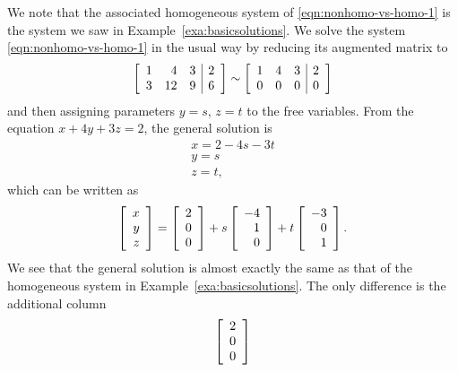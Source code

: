 \begin{solution}
  We note that the associated homogeneous system of
  {\eqref{eqn:nonhomo-vs-homo-1}} is the system we saw in
  Example~\ref{exa:basicsolutions}. We solve the system
  {\eqref{eqn:nonhomo-vs-homo-1}} in the usual way by reducing its
  augmented matrix to {\rref}
  \begin{equation*}
    \left[
    \begin{array}{rrr|r}
      1 & 4 & 3 & 2 \\
      3 & 12 & 9 & 6
    \end{array}
    \right]
    \sim
    \left[
    \begin{array}{rrr|r}
      1 & 4 & 3 & 2 \\
      0 & 0 & 0 & 0
    \end{array}
    \right]
  \end{equation*}
  and then assigning parameters $y=s$, $z=t$ to the free
  variables. From the equation $x+4y+3z=2$, the general solution is
  \begin{equation*}
    \begin{array}{c}
      x = 2 -4s - 3t \\
      y = s \\
      z = t,
    \end{array}
  \end{equation*}
  which can be written as 
  \begin{equation}\label{eqn:nonhomo-vs-homo-2}
    \left[
    \begin{array}{r}
      x\\
      y\\
      z
    \end{array}
    \right]
    =
    \left[
    \begin{array}{r}
      2 \\
      0 \\
      0
    \end{array}
    \right]
    + 
    s
    \left[
    \begin{array}{r}
      -4 \\
      1 \\
      0
    \end{array}
    \right]
    + 
    t
    \left[
    \begin{array}{r}
      -3 \\
      0 \\
      1
    \end{array}
    \right].
  \end{equation}
  We see that the general solution is almost exactly the same as that
  of the homogeneous system in Example~\ref{exa:basicsolutions}. The
  only difference is the additional column
  \begin{equation}\label{eqn:nonhomo-vs-homo-3}
    \left[
    \begin{array}{r}
      2 \\
      0 \\
      0
    \end{array}
    \right]
  \end{equation}    
\end{solution}

